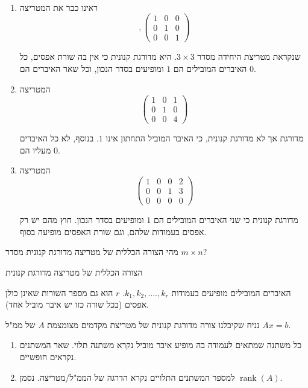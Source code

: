\documentclass[
  hebrew,
  12pt,
  a4paper,
  oneside]{book}
\theoremstyle{definition}
\theoremstyle{remark}
\theoremstyle{plain}
\theoremstyle{remark}
\begin{document}
\begin{example}

~

\begin{enumerate}
\def\labelenumi{\arabic{enumi}.}
\item
  ראינו כבר את המטריצה \[,\begin{pmatrix}1 & 0 & 0\\
  0 & 1 & 0\\
  0 & 0 & 1
  \end{pmatrix}\]

  שנקראת מטריצת היחידה מסדר \(3\times3\). היא מדורגת קנונית כי אין בה
  שורת אפסים, כל האיברים המובילים הם \(1\) ומופיעים בסדר הנכון, וכל שאר
  האיברים הם \(0\).
\item
  המטריצה \[\begin{pmatrix}1 & 0 & 1\\
  0 & 1 & 0\\
  0 & 0 & 4
  \end{pmatrix}\]

  מדורגת אך לא מדורגת קנונית, כי האיבר המוביל התחתון אינו \(1\). בנוסף,
  לא כל האיברים מעליו הם \(0\).
\item
  המטריצה \[\begin{pmatrix}1 & 0 & 0 & 2\\
  0 & 0 & 1 & 3\\
  0 & 0 & 0 & 0
  \end{pmatrix}\]

  מדורגת קנונית כי שני האיברים המובילים הם \(1\) ומופיעים בסדר הנכון.
  חוץ מהם יש רק אפסים בעמודות שלהם, וגם שורת האפסים מופיעה בסוף.
\end{enumerate}

\end{example}

מהי הצורה הכללית של מטריצה מדורגת קנונית מסדר \(m\times n\)?

הצורה הכללית של מטריצה מדורגת קנונית

האיברים המובילים מופיעים בעמודות \(k_1,k_2,....,k_{r}\). \(r\) הוא גם
מספר השורות שאינן כולן אפסים (בכל שורה כזו יש איבר מוביל אחד).

\begin{definition}

נניח שקיבלנו צורה מדורגת קנונית של מטריצת מקדמים מצומצמת \(A\) של ממ"ל
\(Ax=b\).

\begin{enumerate}
\def\labelenumi{\arabic{enumi}.}
\item
  כל משתנה שמתאים לעמודה בה מופיע איבר מוביל נקרא משתנה תלוי. שאר
  המשתנים נקראים חופשיים.
\item
  למספר המשתנים התלויים נקרא הדרגה של הממ"ל/מטריצה. נסמן
  \(\mathop{\mathrm{rank}}(A)\).
\end{enumerate}

\end{definition}
\end{document}
